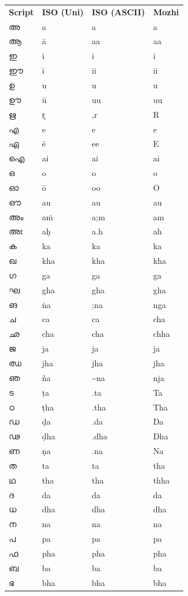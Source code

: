 \documentclass[a4paper]{article}
\begin{document}
\begin{longtable}[l]{p{2.3cm} p{2.3cm} p{2.3cm} p{2.3cm}}
\textbf{Script} & \textbf{ISO (Uni)} & \textbf{ISO (ASCII)} & \textbf{Mozhi} \\[1ex]
അ & a & a & a \\
ആ & ā & aa & aa \\
ഇ & i & i & i \\
ഈ & ī & ii & ii \\
ഉ & u & u & u \\
ഊ & ū & uu & uu \\
ഋ & r̥ & ,r & R \\
എ & e & e & e \\
ഏ & ē & ee & E \\
ഐ & ai & ai & ai \\
ഒ & o & o & o \\
ഓ & ō & oo & O \\
ഔ & au & au & au \\
അം & aṁ & a;m & am \\
അഃ & aḥ & a.h & ah \\
ക & ka & ka & ka \\
ഖ & kha & kha & kha \\
ഗ & ga & ga & ga \\
ഘ & gha & gha & gha \\
ങ & ṅa & ;na & nga \\
ച & ca & ca & cha \\
ഛ & cha & cha & chha \\
ജ & ja & ja & ja \\
ഝ & jha & jha & jha \\
ഞ & ña & \textasciitilde{}na & nja \\
ട & ṭa & .ta & Ta \\
ഠ & ṭha & .tha & Tha \\
ഡ & ḍa & .da & Da \\
ഢ & ḍha & .dha & Dha \\
ണ & ṇa & .na & Na \\
ത & ta & ta & tha \\
ഥ & tha & tha & thha \\
ദ & da & da & da \\
ധ & dha & dha & dha \\
ന & na & na & na \\
പ & pa & pa & pa \\
ഫ & pha & pha & pha \\
ബ & ba & ba & ba \\
ഭ & bha & bha & bha \\

\end{longtable}
\end{document}
